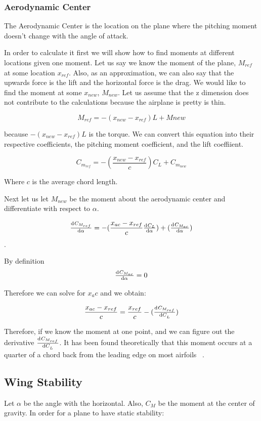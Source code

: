 \subsubsection{Aerodynamic Center}

The Aerodynamic Center is the location on the plane where the pitching moment doesn't
change with the angle of attack. 

In order to calculate it first we will show how to 
find moments at different locations given one moment. 
Let us say we know the moment of the plane, $M_{ref}$ at some
location $x_{ref}$. Also, as an approximation, we can also say that the upwards force
is the lift and the horizontal force is the drag. We would like to find the moment
at some $x_{new}$, $M_{new}$. Let us assume that the z dimension does not contribute to the
calculations because the airplane is pretty  is thin.

\[M_{ref} = -(x_{new} - x_{ref})L + M{new} \] 

because $-(x_{new} - x_{ref})L$ is the torque. We can convert this equation into their
respective coefficients, the pitching moment coefficient, and the lift coeffiient.

\[C_{m_{ref}} = - ( \frac{x_{new} - x_{ref}}{c})C_L + C_{m_{new}} \]

Where $c$ is the average chord length.

Next let us let $M_{new}$ be the moment about the aerodynamic center and
differentiate with respect to $\alpha$.

\[\od{C_{M_{ref}}}{\alpha} = - (\frac{x_{ac} - x_{ref}}{c}\od{C_L}{\alpha}) + (\od{C_{M_{ac}}}{\alpha})\].

By definition 
\[\od{C_{M_{ac}}}{\alpha} = 0\]

Therefore we can solve for $x_ac$ and we obtain:

\[\frac{x_{ac} - x_{ref}}{c} = \frac{x_{ref}}{c} - (\od{C_{M_{ref}}}{C_L})\]

Therefore, if we know the moment at one point, and we can figure out the derivative 
$\od{C_{M_{ref}}}{C_L}$. It has been found theoretically that this moment
occurs at a quarter of a chord back from the leading edge on most airfoils ~\cite{NASAac}.



\subsection{Wing Stability}
Let $\alpha$ be the angle with the horizontal. Also,
$C_M$ be the moment at the center of gravity.  In order for a plane to have static
stability:

